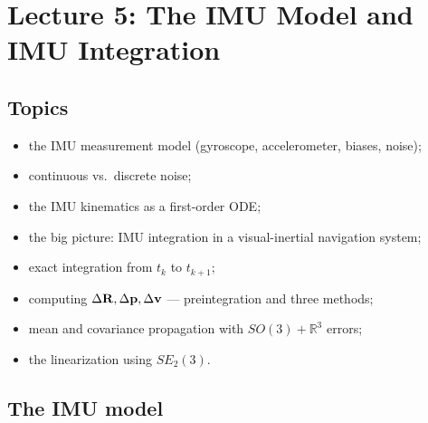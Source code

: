 \section{Lecture 5: The IMU Model and IMU Integration}
\label{sec:lecture05}

\subsection{Topics}
\begin{itemize}[itemsep=0.3em]
\item the IMU measurement model (gyroscope, accelerometer, biases, noise);
\item continuous vs.\ discrete noise;
\item the IMU kinematics as a first-order ODE;
\item the big picture: IMU integration in a visual-inertial navigation system;
\item exact integration from $t_k$ to $t_{k+1}$;
\item computing $\Delta\boldsymbol{\mathbf{R}},\Delta\boldsymbol{\mathbf{p}},\Delta\boldsymbol{\mathbf{v}}$ --- preintegration and three methods;
\item mean and covariance propagation with $SO(3)+\mathbb{R}^{3}$ errors;
\item the linearization using $SE_2(3)$.
\end{itemize}

\setlength{\arraycolsep}{3.5pt}

\subsection{The IMU model}

